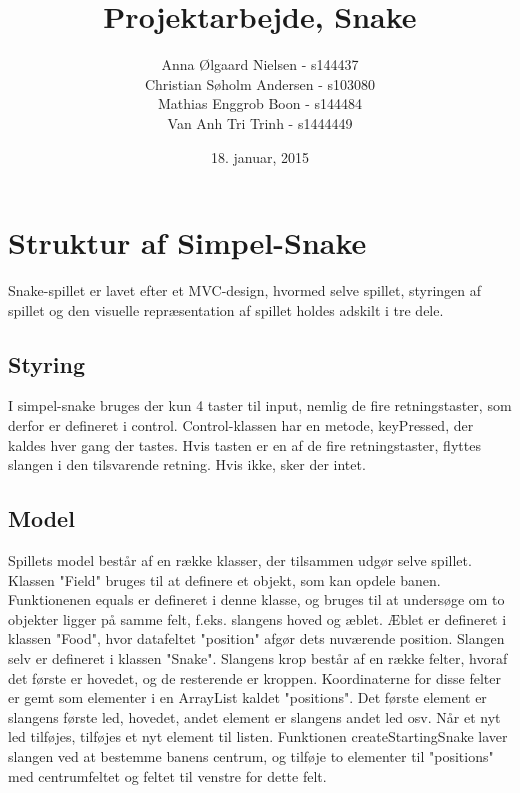 \documentclass{report}
\begin{document}
\setcounter{chapter}{1}

\title{Projektarbejde, Snake}
\date{18. januar, 2015}
\author{	Anna Ølgaard Nielsen - s144437\\
		Christian Søholm Andersen - s103080\\
		Mathias Enggrob Boon - s144484\\
		Van Anh Tri Trinh - s1444449}
\maketitle

\tableofcontents
\newpage

\section{Struktur af Simpel-Snake}

Snake-spillet er lavet efter et MVC-design, hvormed selve spillet, styringen af spillet og den visuelle repræsentation af spillet holdes adskilt i tre dele.

\subsection{Styring}
I simpel-snake bruges der kun 4 taster til input, nemlig de fire retningstaster, som derfor er defineret i control. Control-klassen har en metode, keyPressed, der kaldes hver gang der tastes. Hvis tasten er en af de fire retningstaster, flyttes slangen i den tilsvarende retning. Hvis ikke, sker der intet.

\subsection{Model}
Spillets model består af en række klasser, der tilsammen udgør selve spillet.
Klassen "Field" bruges til at definere et objekt, som kan opdele banen. Funktionenen equals er defineret i denne klasse, og bruges til at undersøge om to objekter ligger på samme felt, f.eks. slangens hoved og æblet. Æblet er defineret i klassen "Food", hvor datafeltet "position" afgør dets nuværende position. 
Slangen selv er defineret i klassen "Snake". Slangens krop består af en række felter, hvoraf det første er hovedet, og de resterende er kroppen. Koordinaterne for disse felter er gemt som elementer i en ArrayList kaldet "positions". Det første element er slangens første led, hovedet, andet element er slangens andet led osv. Når et nyt led tilføjes, tilføjes et nyt element til listen. Funktionen createStartingSnake laver slangen ved at bestemme banens centrum, og tilføje to elementer til "positions" med centrumfeltet og feltet til venstre for dette felt.
\end{document}
